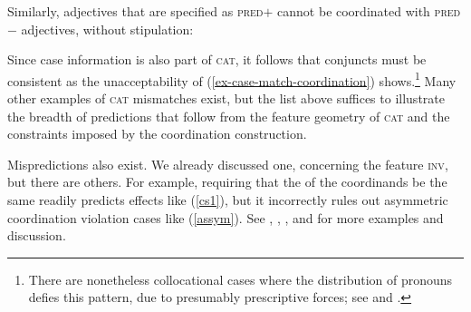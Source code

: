 {
\zl

Similarly, adjectives that are specified as \textsc{pred}$+$ cannot be
coordinated with  \textsc{pred}$-$ adjectives, without stipulation:

\eal
{}
\zl


\noindent
Since case information is also part of \textsc{cat}, it follows that conjuncts must be consistent as the unacceptability of  (\ref{ex-case-match-coordination}) shows.\footnote{There are nonetheless collocational cases where the distribution of pronouns defies this pattern, due to presumably prescriptive forces; see \citet{grano} and \citet{binomial}.}
 Many other examples of \textsc{cat} mismatches exist, but the  list above suffices to
illustrate the breadth of predictions that follow from the feature geometry of \textsc{cat} and the constraints imposed by
the coordination construction.

\eal
\label{ex-case-match-coordination}
\zl




Mispredictions also exist. We already discussed one, concerning the feature \textsc{inv}, but there are others. For example, requiring that the \slashv of the coordinands be the same readily predicts  effects like 
(\ref{cs1}), but it incorrectly rules out asymmetric coordination violation cases like (\ref{assym}). 
See \citet{goldsmith}, \citet{lakoff86}, \citet{levinprince86}, and \citet{kehler} for more examples and discussion.


\begin{exe}
\ex \begin{xlista}


\end{xlista}
\end{exe}}
